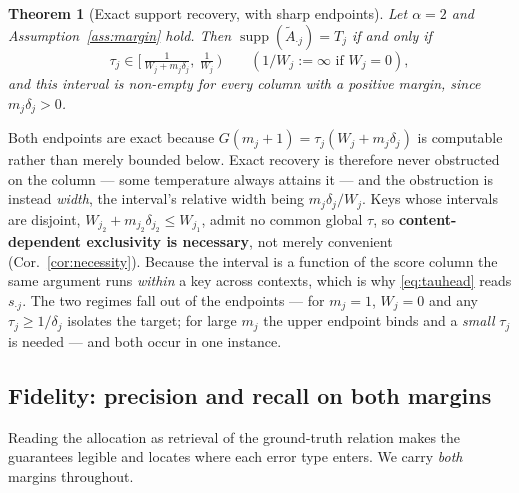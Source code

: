 \documentclass{article}
\newtheorem{theorem}{Theorem}
\newcommand{\supp}{\operatorname{supp}}
\begin{document}
\begin{theorem}[Exact support recovery, with sharp endpoints]
\label{thm:recovery}
Let $\alpha=2$ and Assumption~\ref{ass:margin} hold. Then $\supp(\tilde A_{\cdot j}) = T_j$
\emph{if and only if}
\begin{equation}
\tau_j \in \big[\,\tfrac{1}{W_j+m_j\delta_j},\ \tfrac{1}{W_j}\,\big)
\qquad(1/W_j := \infty \text{ if } W_j=0),
\label{eq:interval}
\end{equation}
and this interval is non-empty for \emph{every} column with a positive margin, since
$m_j\delta_j>0$.
\end{theorem}

Both endpoints are exact because $G(m_j{+}1)=\tau_j(W_j+m_j\delta_j)$ is computable rather than
merely bounded below. Exact recovery is therefore never obstructed on the column --- some
temperature always attains it --- and the obstruction is instead \emph{width}, the interval's
relative width being $m_j\delta_j/W_j$. Keys whose intervals are disjoint,
$W_{j_2}+m_{j_2}\delta_{j_2}\le W_{j_1}$, admit no common global $\tau$, so
\textbf{content-dependent exclusivity is necessary}, not merely convenient
(Cor.~\ref{cor:necessity}). Because the interval is a function of the score column the same
argument runs \emph{within} a key across contexts, which is why \eqref{eq:tauhead} reads
$s_{\cdot j}$. The two regimes fall out of the endpoints --- for $m_j=1$, $W_j=0$ and
any $\tau_j\ge1/\delta_j$ isolates the target; for large $m_j$ the upper endpoint binds and a
\emph{small} $\tau_j$ is needed --- and both occur in one instance.

\subsection{Fidelity: precision and recall on both margins}
\label{sec:fidelity}

Reading the allocation as retrieval of the ground-truth relation makes the guarantees legible and
locates where each error type enters. We carry \emph{both} margins throughout.
\end{document}
